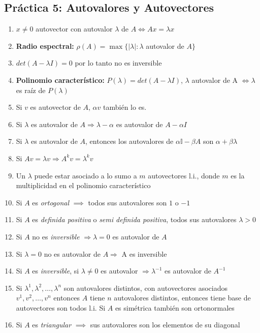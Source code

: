 \subsection*{Práctica 5: Autovalores y Autovectores}
\begin{enumerate}
    \item $x \neq 0$ autovector con autovalor $\lambda$ de $A \iff Ax = \lambda x$ 
    \item \textbf{Radio espectral:} $\rho(A) = \max \{|\lambda| : \lambda$ autovalor de $A\}$
    \item $det(A-\lambda I) = 0$ por lo tanto no es inversible
    \item \textbf{Polinomio característico:} $P(\lambda) = det(A-\lambda I)$, $\lambda$ autovalor de A $\iff \lambda$ es raíz de $P(\lambda)$
    \item Si $v$ es autovector de $A$, $\alpha v$ también lo es. 
    \item Si $\lambda$ es autovalor de $A \Rightarrow \lambda - \alpha$ es autovalor de $A - \alpha I$
    \item Si $\lambda$ es autovalor de $A$, entonces los autovalores de $\alpha\mathbb{I}-\beta A$ son $\alpha+\beta \lambda$ 
    \item Si $Av = \lambda v \Rightarrow A^kv = \lambda^k v$
    \item Un $\lambda$ puede estar asociado a lo sumo a $m$ autovectores l.i., donde $m$ es la multiplicidad en el polinomio característico
    \item Si $A$ es \textit{ortogonal} $\implies$ todos sus autovalores son $1$ o $-1$
    \item Si $A$ es \textit{definida positiva} o \textit{semi definida positiva}, todos sus autovalores $\lambda > 0$ 
    \item Si $A$ no es \textit{inversible} $\Rightarrow \lambda = 0$ es autovalor de $A$
    \item Si $\lambda = 0$ no es autovalor de $A \Rightarrow$ A es inversible
    \item Si $A$ es \textit{inversible}, si $\lambda \neq 0$ es autovalor $\Rightarrow \lambda^{-1}$ es autovalor de $A^{-1}$
    \item Si $\lambda^1, \lambda^2, \dots, \lambda^n$ son autovalores distintos, con autovectores asociados $v^1, v^2, \dots, v^n$ entonces $A$ tiene $n$ autovalores distintos, entonces tiene base de autovectores son todos l.i. Si $A$ es simétrica también son ortonormales
    \item Si $A$ es \textit{triangular} $\implies$ sus autovalores son los elementos de su diagonal

\end{enumerate}
